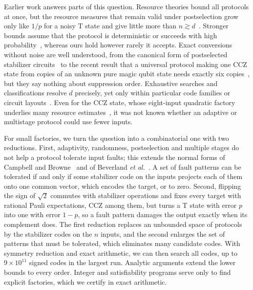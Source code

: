 \documentclass[aps,prl,reprint,twocolumn,amsmath,amssymb,floatfix,nofootinbib,superscriptaddress]{revtex4-2}
\begin{document}
Earlier work answers parts of this question. Resource theories bound all protocols at once, but the resource measures that remain valid under postselection grow only like $1/p$ for a noisy T state and give little more than $n\gtrsim d$~\cite{fangliu,fangliu2,regulaprl}. Stronger bounds assume that the protocol is deterministic or succeeds with high probability~\cite{regulatakagi,seddon}, whereas ours hold however rarely it accepts. Exact conversions without noise are well understood, from the canonical form of postselected stabilizer circuits~\cite{beverland} to the recent result that a universal protocol making one CCZ state from copies of an unknown pure magic qubit state needs exactly six copies~\cite{rizzoleone}, but they say nothing about suppression order. Exhaustive searches and classifications resolve $d$ precisely, yet only within particular code families or circuit layouts~\cite{nezamihaah,wjs,jacinto,borrowed,kbk}. Even for the CCZ state, whose eight-input quadratic factory~\cite{eastin,jones,haah} underlies many resource estimates~\cite{litinski,gidneyfowler}, it was not known whether an adaptive or multistage protocol could use fewer inputs.

For small factories, we turn the question into a combinatorial one with two reductions. First, adaptivity, randomness, postselection and multiple stages do not help a protocol tolerate input faults; this extends the normal forms of Campbell and Browne~\cite{campbellbrowne} and of Beverland \emph{et al.}~\cite{beverland}. A set of fault patterns can be tolerated if and only if some stabilizer code on the inputs projects each of them onto one common vector, which encodes the target, or to zero. Second, flipping the sign of $\sqrt2$ commutes with stabilizer operations and fixes every target with rational Pauli expectations, CCZ among them, but turns a T state with error $p$ into one with error $1-p$, so a fault pattern damages the output exactly when its complement does. The first reduction replaces an unbounded space of protocols by the stabilizer codes on the $n$ inputs, and the second enlarges the set of patterns that must be tolerated, which eliminates many candidate codes. With symmetry reduction and exact arithmetic, we can then search all codes, up to $9\times10^{11}$ signed codes in the largest run. Analytic arguments extend the lower bounds to every order. Integer and satisfiability programs serve only to find explicit factories, which we certify in exact arithmetic.
\end{document}
